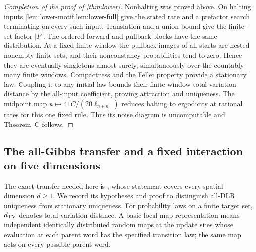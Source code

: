 \begin{proof}[Completion of the proof of \cref{thm:lower}]
Nonhalting was proved above. On halting inputs \cref{lem:lower-motif,lem:lower-full} give the stated rate and a prefactor search terminating on every such input. Translation and a union bound give the finite-set factor $|F|$. The ordered forward and pullback blocks have the same distribution. At a fixed finite window the pullback images of all starts are nested nonempty finite sets, and their nonconstancy probabilities tend to zero. Hence they are eventually singletons almost surely, simultaneously over the countably many finite windows. Compactness and the Feller property provide a stationary law. Coupling it to any initial law bounds their finite-window total variation distance by the all-input coefficient, proving attraction and uniqueness. The midpoint map $n\mapsto41C/(20\ell_{n+n_0})$ reduces halting to ergodicity at rational rates for this one fixed rule. Thus its noise diagram is uncomputable and Theorem~C follows.
\end{proof}

\subsection{The all-Gibbs transfer and a fixed interaction on five dimensions}

The exact transfer needed here is \cite[Corollary~13.7, equations~(7)--(8)]{DMst}, whose statement covers every spatial dimension $d\ge1$. We record its hypotheses and proof to distinguish all-DLR uniqueness from stationary uniqueness. For probability laws on a finite target set, $d_{\rm TV}$ denotes total variation distance. A basic local-map representation means independent identically distributed random maps at the update sites whose evaluation at each parent word has the specified transition law; the same map acts on every possible parent word.


